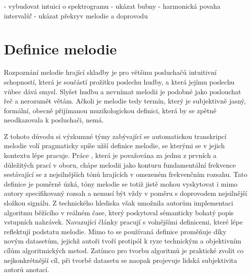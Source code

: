 - vybudovat intuici o spektrogramu - ukázat bubny
- harmonická povaha intervalů! - ukázat překryv melodie a doprovodu










\section{Definice melodie}

Rozpoznání melodie hrající skladby je pro většinu posluchačů intuitivní schopností, která je součástí prožitku poslechu hudby, a která jejímu poslechu vůbec dává smysl. Slyšet hudbu a nevnímat melodii je podobné jako poslouchat řeč a nerozumět větám. Ačkoli je melodie tedy termín, který je subjektivně jasný, formální, obecně přijímanou muzikologickou definici, která by se zpětně neodkazovala k posluchači, nemá. 

Z tohoto důvodu si výzkumné týmy zabývající se automatickou transkripcí melodie volí pragmaticky spíše užší definice melodie, se kterými se v jejich kontextu lépe pracuje. Práce \cite{Goto1999}, která je považována za jednu z prvních a důležitých prací v oboru, chápe melodii jako konturu fundamentální frekvence sestávající se z nejsilnějších tónů hrajících v omezeném frekvenčním rozsahu. Tato definice je poměrně úzká, tóny melodie se totiž jistě mohou vyskytovat i mimo autory specifikovaný rozsah a nemusí být vždy v poměru s doprovodem nejsilnější složkou signálu. Z technického hlediska však umožnila autorům implementaci algoritmu běžícího v reálném čase, který poskytoval sémanticky bohatý popis vstupních nahrávek. Navazující články pracují s volnějšími definicemi, které lépe reflektují podstatu melodie. Mimo to se používaná definice proměňuje díky novým datasetům, jejichž autoři tvoří protipól k ryze technickým a objektivním cílům algoritmických metod. Zatímco pro tvorbu algoritmů je praktické zvolit co nejkonkrétnější cíl, při tvorbě datasetu se naopak projevuje lidská subjektivita autorů anotací. 

